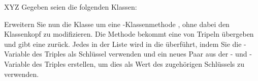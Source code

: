 \documentclass{../tuda-exercise}
\begin{document}
  \clearpagesolution

  \begin{task}[credit=\stars{3}{3}]{XYZ}
    Gegeben seien die folgenden Klassen:

    

    Erweitern Sie nun die Klasse  um eine -Klassenmethode
    , ohne dabei den Klassenkopf zu modifizieren. Die Methode bekommt eine
     von Tripeln übergeben und gibt eine 
    zurück. Jedes  in der Liste wird in die  überführt, indem
    Sie die -Variable des Triples als Schlüssel verwenden und ein neues Paar aus
    der - und -Variable des Triples erstellen, um dies als Wert des
    zugehörigen Schlüssels zu verwenden.

    \begin{solution}
      
    \end{solution}
  \end{task}

  \clearpage
\end{document}
